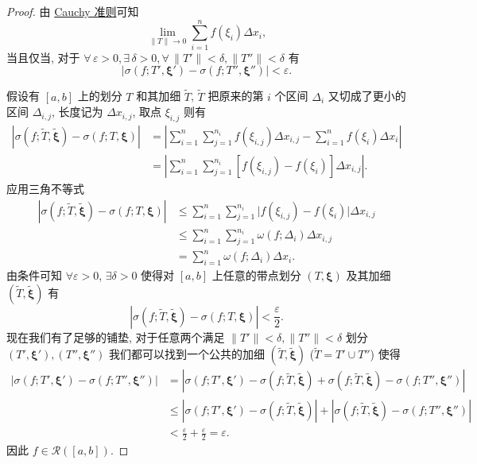 \documentclass[cn,toc=twocol]{elegantbook}
\newcommand{\ve}[1]{\boldsymbol{#1}}
\begin{document}
\begin{proof}
	由 \hyperref[thm:R5]{Cauchy 准则}可知
	\[
		\lim_{\lVert T \rVert \to 0} \sum_{i=1}^{n} f(\xi_i) \Delta x_i,
	\]
	当且仅当, 对于 $\forall\, \varepsilon > 0, \exists\, \delta > 0, \forall\, \lVert T' \rVert < \delta, \lVert T''\rVert < \delta$ 有
	\[
		\left\lvert \sigma(f;T',\ve\xi') - \sigma(f;T'',\ve\xi'') \right\rvert < \varepsilon.
	\]
	
	假设有 $[a,b]$ 上的划分 $T$ 和其加细 $\widetilde T$, $\widetilde T$ 把原来的第 $i$ 个区间 $\Delta_i$ 又切成了更小的区间 $\Delta_{i,j}$, 长度记为 $\Delta x_{i,j}$, 取点 $\xi_{i,j}$ 则有
	\[
	\begin{aligned}
		\left\lvert \sigma(f;\widetilde T,\widetilde{\ve\xi}) - \sigma(f;T,\ve\xi) \right\rvert  &= \left\lvert \sum_{i=1}^n \sum_{j=1}^{n_i} f(\xi_{i,j}) \Delta x_{i,j} - \sum_{i=1}^n f(\xi_i) \Delta x_i \right\rvert\\
		&= \left\lvert \sum_{i=1}^n \sum_{j=1}^{n_i} [f(\xi_{i,j})  - f(\xi_i)] \Delta x_{i,j} \right\rvert.
	\end{aligned}
	\]
	应用三角不等式
	\[
	\begin{aligned}
		\left\lvert \sigma(f;\widetilde T,\widetilde{\ve\xi}) - \sigma(f;T,\ve\xi) \right\rvert  &\le \sum_{i=1}^n \sum_{j=1}^{n_i} \lvert f(\xi_{i,j}) - f(\xi_i)\rvert \Delta x_{i,j}\\
		&\le \sum_{i=1}^n \sum_{j=1}^{n_i} \omega(f;\Delta_{i}) \Delta x_{i,j}\\
		&= \sum_{i=1}^n \omega(f;\Delta_{i}) \Delta x_{i}.
	\end{aligned}
	\]
	由条件可知 $\forall \varepsilon > 0$, $\exists \delta > 0$ 使得对 $[a,b]$ 上任意的带点划分 $(T,\ve\xi)$ 及其加细 $(\widetilde T,\widetilde{\ve\xi})$ 有
	\[
		\left\lvert \sigma(f;\widetilde T,\widetilde{\ve\xi}) - \sigma(f;T,\ve\xi) \right\rvert < \frac{\varepsilon}{2}.
	\]
	现在我们有了足够的铺垫, 对于任意两个满足 $\lVert T'\rVert < \delta,\lVert T''\rVert < \delta$ 划分 $(T',\ve\xi'), (T'',\ve\xi'')$ 我们都可以找到一个公共的加细 $(\widetilde T,\widetilde{\ve\xi})$ ($\widetilde T = T' \cup T''$) 使得
	\[
		\begin{aligned}
			\left\lvert \sigma(f; T', \ve\xi') - \sigma(f; T'', \ve\xi'') \right\rvert &= \left\lvert \sigma(f; T', \ve\xi') - \sigma(f; \widetilde{T}, \widetilde{\ve\xi}) + \sigma(f; \widetilde{T}, \widetilde{\ve\xi}) - \sigma(f; T'', \ve\xi'') \right\rvert \\
 			&\le \left\lvert \sigma(f; T', \ve\xi') - \sigma(f; \widetilde{T}, \widetilde{\ve\xi}) \right\rvert + \left\lvert \sigma(f; \widetilde{T}, \widetilde{\ve\xi}) - \sigma(f; T'', \ve\xi'') \right\rvert \\
 			&< \frac{\varepsilon}{2} + \frac{\varepsilon}{2} = \varepsilon.
 		\end{aligned}
	\]
	因此 $f \in \mathscr{R}([a,b])$.
\end{proof}
\end{document}
